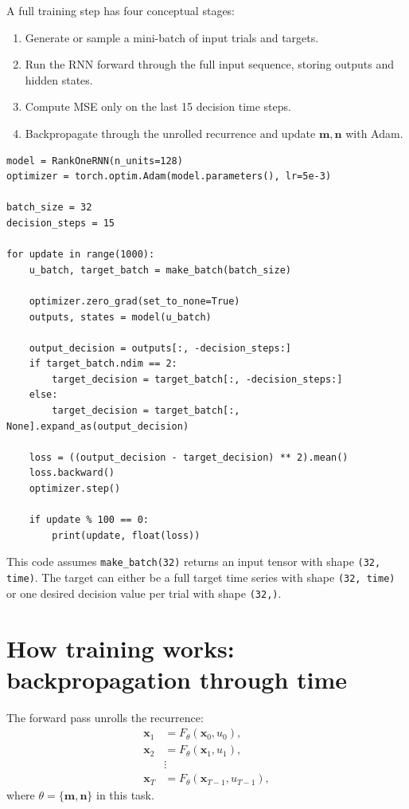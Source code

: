 \documentclass[11pt]{article}
\newcommand{\vx}{\mathbf{x}}
\newcommand{\vm}{\mathbf{m}}
\newcommand{\vn}{\mathbf{n}}
\begin{document}
A full training step has four conceptual stages:
\begin{enumerate}
  \item Generate or sample a mini-batch of input trials and targets.
  \item Run the RNN forward through the full input sequence, storing outputs and
  hidden states.
  \item Compute MSE only on the last 15 decision time steps.
  \item Backpropagate through the unrolled recurrence and update $\vm,\vn$ with
  Adam.
\end{enumerate}

\begin{lstlisting}[style=python]
model = RankOneRNN(n_units=128)
optimizer = torch.optim.Adam(model.parameters(), lr=5e-3)

batch_size = 32
decision_steps = 15

for update in range(1000):
    u_batch, target_batch = make_batch(batch_size)

    optimizer.zero_grad(set_to_none=True)
    outputs, states = model(u_batch)

    output_decision = outputs[:, -decision_steps:]
    if target_batch.ndim == 2:
        target_decision = target_batch[:, -decision_steps:]
    else:
        target_decision = target_batch[:, None].expand_as(output_decision)

    loss = ((output_decision - target_decision) ** 2).mean()
    loss.backward()
    optimizer.step()

    if update % 100 == 0:
        print(update, float(loss))
\end{lstlisting}

This code assumes \texttt{make\_batch(32)} returns an input tensor with shape
\texttt{(32, time)}. The target can either be a full target time series with
shape \texttt{(32, time)} or one desired decision value per trial with shape
\texttt{(32,)}.

\section{How training works: backpropagation through time}

The forward pass unrolls the recurrence:
\begin{align}
  \vx_1 &= F_\theta(\vx_0, u_0),\\
  \vx_2 &= F_\theta(\vx_1, u_1),\\
  &\vdots\\
  \vx_T &= F_\theta(\vx_{T-1}, u_{T-1}),
\end{align}
where $\theta = \{\vm,\vn\}$ in this task.
\end{document}
